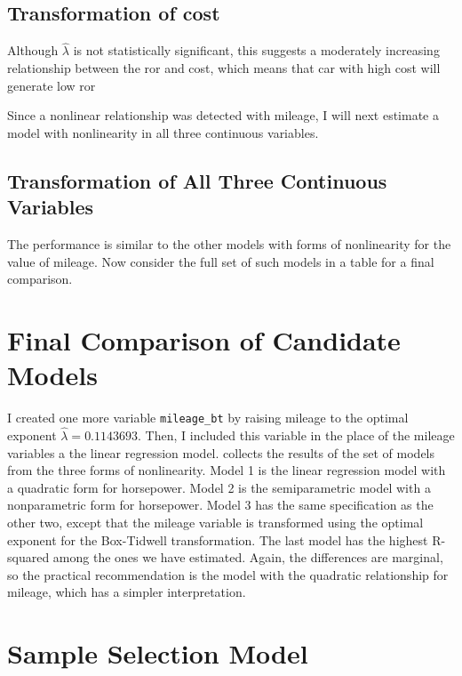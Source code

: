\documentclass[11pt]{paper}
\begin{document}
\subsection{Transformation of cost}




Although $\hat{\lambda}$ is not statistically significant,
this suggests a moderately increasing relationship
between the ror and cost,
which means that car with high cost
will generate low ror

Since a nonlinear relationship was detected with mileage,
I will next estimate a model
with nonlinearity in all three continuous variables.


\subsection{Transformation of All Three Continuous Variables}





The performance is similar to the other models with
forms of nonlinearity for the value of mileage.
Now consider the full set of such models in a table for a final comparison.


\pagebreak
\section{Final Comparison of Candidate Models}

I created one more variable \texttt{mileage\_bt}
by raising mileage to the optimal exponent 
$\hat{\lambda} = 0.1143693$. 
Then, I included this variable in the place of 
the mileage variables a the linear regression model.
% 
collects the results
of the set of models from the three forms of nonlinearity.
Model 1 is the linear regression model with 
a quadratic form for horsepower. 
Model 2 is the semiparametric model with
a nonparametric form for horsepower. 
Model 3 has the same specification as the other two, 
except that the mileage variable is transformed using the optimal
exponent for the Box-Tidwell transformation. 
% 
The last model has the highest R-squared
among the ones we have estimated.
Again, the differences are marginal, so the practical recommendation
is the model with the quadratic relationship for mileage, 
which has a simpler interpretation.
 


\clearpage
\section{Sample Selection Model }
\end{document}
